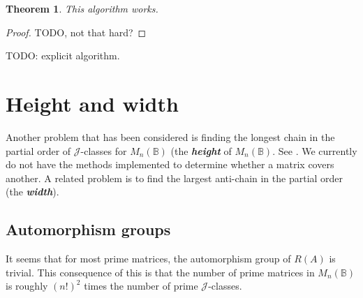 \documentclass[11pt]{article}
\newtheorem{thm}{Theorem}[section]
\newcommand{\defn}[1]{\textbf{\textit{#1}}}
\numberwithin{equation}{section}
\newcommand{\B}{\mathbb{B}}
\newcommand{\Bn}{M_n(\B)}
\newcommand{\J}{\mathscr{J}}
\begin{document}
\begin{thm}
  This algorithm works.
\end{thm}
\begin{proof}
  TODO, not that hard?
\end{proof}

TODO: explicit algorithm.



\section{Height and width}
Another problem that has been considered is finding the longest chain in the
partial order of $\J$-classes for $\Bn$ (the \defn{height} of $\Bn$. 
See \cite{Breen2001}. We currently do not have the methods implemented to determine whether a matrix covers another.
A related problem is to find the largest anti-chain in the partial order
(the \defn{width}).




\subsection*{Automorphism groups}
It seems that for most prime matrices, the automorphism group of $R(A)$ is trivial. This consequence of this is that the number of prime matrices in $\Bn$ is roughly $(n!)^2$ times the number of prime $\J$-classes.

\printbibliography
\end{document}
